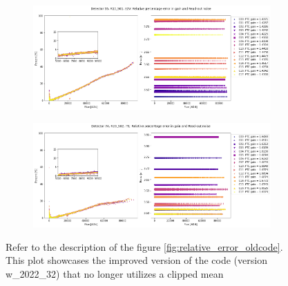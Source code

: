\begin{figure}[!htb]
     \centering
     \begin{subfigure}[b]{\textwidth}
         \centering
         \includegraphics[width=\textwidth]{Figures/Relative_Error_Gain_Noise_detectorR13_S01.png}
     \end{subfigure}
     \vspace{3mm}
     \begin{subfigure}[b]{\textwidth}
         \centering
         \includegraphics[width=\textwidth]{Figures/Relative_Error_Gain_Noise_detectorR20_S02.png}
     \end{subfigure}
        \caption{Refer to the description of the figure \ref{fig:relative_error_oldcode}. This plot showcases the improved version of the code (version w\_2022\_32) that no longer utilizes a clipped mean}
        \label{fig:relative_error}
\end{figure}

